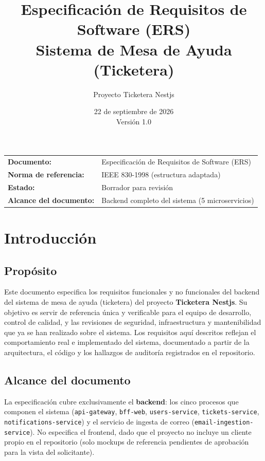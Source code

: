 \documentclass[11pt,a4paper]{article}
\title{\color{pantone186}\textbf{Especificación de Requisitos de Software (ERS)}\\[0.3em]
\Large Sistema de Mesa de Ayuda (Ticketera)}
\author{Proyecto Ticketera Nestjs}
\date{22 de septiembre de 2026 \\ Versión 1.0}
\begin{document}
\maketitle
\thispagestyle{empty}

\begin{center}
\begin{tabular}{ll}
\textbf{Documento:} & Especificación de Requisitos de Software (ERS) \\
\textbf{Norma de referencia:} & IEEE 830-1998 (estructura adaptada) \\
\textbf{Estado:} & Borrador para revisión \\
\textbf{Alcance del documento:} & Backend completo del sistema (5 microservicios) \\
\end{tabular}
\end{center}

\newpage
\tableofcontents
\newpage

\section{Introducción}

\subsection{Propósito}
Este documento especifica los requisitos funcionales y no funcionales del
backend del sistema de mesa de ayuda (ticketera) del proyecto
\textbf{Ticketera Nestjs}. Su objetivo es servir de referencia única y
verificable para el equipo de desarrollo, control de calidad, y las
revisiones de seguridad, infraestructura y mantenibilidad que ya se han
realizado sobre el sistema. Los requisitos aquí descritos reflejan el
comportamiento real e implementado del sistema, documentado a partir de la
arquitectura, el código y los hallazgos de auditoría registrados en el
repositorio.

\subsection{Alcance del documento}
La especificación cubre exclusivamente el \textbf{backend}: los cinco
procesos que componen el sistema (\texttt{api-gateway}, \texttt{bff-web},
\texttt{users-service}, \texttt{tickets-service},
\texttt{notifications-service}) y el servicio de ingesta de correo
(\texttt{email-ingestion-service}). No especifica el frontend, dado que el
proyecto no incluye un cliente propio en el repositorio (solo mockups de
referencia pendientes de aprobación para la vista del solicitante).
\end{document}
